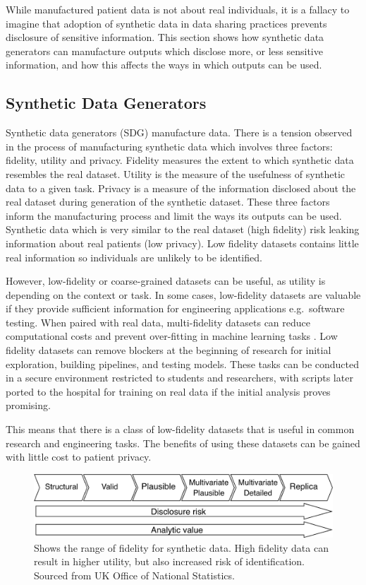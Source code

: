 \documentclass[11pt]{article}
\begin{document}
While manufactured patient data is not about real individuals, it is a fallacy to imagine that adoption of synthetic data in data sharing practices prevents disclosure of sensitive information. This section shows how synthetic data generators can manufacture outputs which disclose more, or less sensitive information, and how this affects the ways in which outputs can be used.

\subsection{Synthetic Data Generators}

Synthetic data generators (SDG) manufacture data. There is a tension observed in the process of manufacturing synthetic data which involves three factors: fidelity, utility and privacy. Fidelity measures the extent to which synthetic data resembles the real dataset. Utility is the measure of the usefulness of synthetic data to a given task. Privacy is a measure of the information disclosed about the real dataset during generation of the synthetic dataset. These three factors inform the manufacturing process and limit the ways its outputs can be used. Synthetic data which is very similar to the real dataset (high fidelity) risk leaking information about real patients (low privacy). Low fidelity datasets contains little real information so individuals are unlikely to be identified. 

However, low-fidelity or coarse-grained datasets can be useful, as utility is depending on the context or task. In some cases, low-fidelity datasets are valuable if they provide sufficient information for engineering applications e.g.\ software testing. When paired with real data, multi-fidelity datasets can reduce computational costs and prevent over-fitting in machine learning tasks \cite{Patra2020}\cite{Santoni2024}\cite{berkson2019}. Low fidelity datasets can remove blockers at the beginning of research for initial exploration, building pipelines, and testing models. These tasks can be conducted in a secure environment restricted to students and researchers, with scripts later ported to the hospital for training on real data if the initial analysis proves promising.

This means that there is a class of low-fidelity datasets that is useful in common research and engineering tasks. The benefits of using these datasets can be gained with little cost to patient privacy. 

\begin{figure}[ht]
\centering
\includegraphics[width=0.8\linewidth]{figures/ONS.png}
\caption{Shows the range of fidelity for synthetic data. High fidelity data can result in higher utility, but also increased risk of identification. Sourced from UK Office of National Statistics.}
\label{fig:Range of fidelity for synthetic data}
\end{figure}
\end{document}
